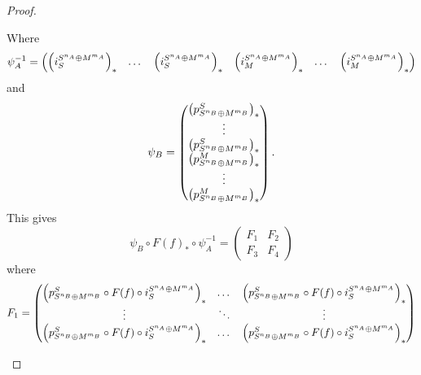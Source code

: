 \begin{proof}
\begin{enumerate}
{\begin{center}
            \end{center}
            Where
            \[
                \psi_A^{-1} = \begin{pmatrix}
                    \left(  i_S^{S^{n_A} \oplus M^{m_A}}  \right)_* & \dots & \left(  i_S^{S^{n_A} \oplus M^{m_A}}  \right)_* & \left(  i_M^{S^{n_A} \oplus M^{m_A}}  \right)_* & \dots & \left(  i_M^{S^{n_A} \oplus M^{m_A}}  \right)_*
                \end{pmatrix}
            \]
            and
            \[
                \psi_B = \begin{pmatrix}
                    \left(  p_{S^{n_B} \oplus M^{m_B}}^S  \right)_* \\
                    \vdots \\
                    \left(  p_{S^{n_B} \oplus M^{m_B}}^S  \right)_* \\
                    \left(  p_{S^{n_B} \oplus M^{m_B}}^M  \right)_* \\
                    \vdots \\
                    \left(  p_{S^{n_B} \oplus M^{m_B}}^M  \right)_*
                \end{pmatrix}.
            \]
            This gives
            \[
                \psi_B \circ F(f)_* \circ \psi_A^{-1} = \begin{pmatrix}
                    F_1 & F_2 \\
                    F_3 & F_4
                \end{pmatrix}
            \]
            where
            \[
                F_1 = \begin{pmatrix}
                    \left(  p_{S^{n_B} \oplus M^{m_B}}^S \circ F(f) \circ i_S^{S^{n_A} \oplus M^{m_A}}  \right)_* & \dots & \left(  p_{S^{n_B} \oplus M^{m_B}}^S \circ F(f) \circ i_S^{S^{n_A} \oplus M^{m_A}}  \right)_* \\
                    \vdots & \ddots & \vdots \\
                    \left(  p_{S^{n_B} \oplus M^{m_B}}^S \circ F(f) \circ i_S^{S^{n_A} \oplus M^{m_A}}  \right)_* & \dots & \left(  p_{S^{n_B} \oplus M^{m_B}}^S \circ F(f) \circ i_S^{S^{n_A} \oplus M^{m_A}}  \right)_* \\

\end{pmatrix}\]}
\end{enumerate}
\end{proof}
